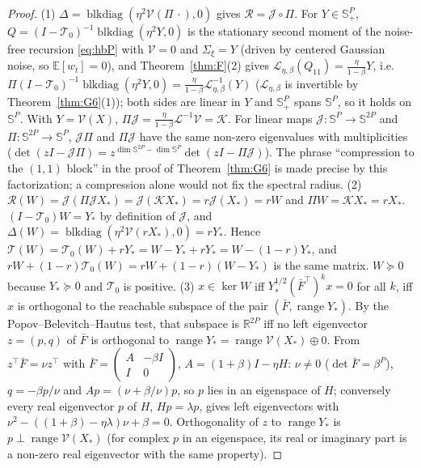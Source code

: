 \documentclass[11pt]{article}
\theoremstyle{remark}
\newcommand{\E}{\mathbb{E}}
\newcommand{\R}{\mathbb{R}}
\begin{document}
\begin{proof}
(1) $\Delta=\operatorname{blkdiag}(\eta^2\mathcal V(\Pi\,\cdot),0)$ gives $\mathcal R=\mathcal J\circ\Pi$. For $Y\in\mathbb S^P_+$, $Q=(I-\mathcal T_0)^{-1}\operatorname{blkdiag}(\eta^2Y,0)$ is the stationary second moment of the noise-free recursion \eqref{eq:hbP} with $\mathcal V=0$ and $\Sigma_\xi=Y$ (driven by centered Gaussian noise, so $\E[w_t]=0$), and Theorem~\ref{thm:F}(2) gives $\mathcal L_{\eta,\beta}(Q_{11})=\frac{\eta}{1-\beta}Y$, i.e.\ $\Pi(I-\mathcal T_0)^{-1}\operatorname{blkdiag}(\eta^2Y,0)=\frac{\eta}{1-\beta}\mathcal L_{\eta,\beta}^{-1}(Y)$ ($\mathcal L_{\eta,\beta}$ is invertible by Theorem~\ref{thm:G6}(1)); both sides are linear in $Y$ and $\mathbb S^P_+$ spans $\mathbb S^P$, so it holds on $\mathbb S^P$. With $Y=\mathcal V(X)$, $\Pi\mathcal J=\frac{\eta}{1-\beta}\mathcal L^{-1}\mathcal V=\mathcal K$. For linear maps $\mathcal J:\mathbb S^P\to\mathbb S^{2P}$ and $\Pi:\mathbb S^{2P}\to\mathbb S^P$, $\mathcal J\Pi$ and $\Pi\mathcal J$ have the same non-zero eigenvalues with multiplicities ($\det(zI-\mathcal J\Pi)=z^{\dim\mathbb S^{2P}-\dim\mathbb S^P}\det(zI-\Pi\mathcal J)$). The phrase ``compression to the $(1,1)$ block'' in the proof of Theorem~\ref{thm:G6} is made precise by this factorization; a compression alone would not fix the spectral radius.
(2) $\mathcal R(W)=\mathcal J(\Pi\mathcal J X_*)=\mathcal J(\mathcal KX_*)=r\mathcal J(X_*)=rW$ and $\Pi W=\mathcal KX_*=rX_*$. $(I-\mathcal T_0)W=Y_*$ by definition of $\mathcal J$, and $\Delta(W)=\operatorname{blkdiag}(\eta^2\mathcal V(rX_*),0)=rY_*$. Hence $\mathcal T(W)=\mathcal T_0(W)+rY_*=W-Y_*+rY_*=W-(1-r)Y_*$, and $rW+(1-r)\mathcal T_0(W)=rW+(1-r)(W-Y_*)$ is the same matrix. $W\succeq0$ because $Y_*\succeq0$ and $\mathcal T_0$ is positive.
(3) $x\in\ker W$ iff $Y_*^{1/2}(\bar F^\top)^kx=0$ for all $k$, iff $x$ is orthogonal to the reachable subspace of the pair $(\bar F,\operatorname{range}Y_*)$. By the Popov--Belevitch--Hautus test, that subspace is $\R^{2P}$ iff no left eigenvector $z=(p,q)$ of $\bar F$ is orthogonal to $\operatorname{range}Y_*=\operatorname{range}\mathcal V(X_*)\oplus0$. From $z^\top\bar F=\nu z^\top$ with $\bar F=\begin{pmatrix}A&-\beta I\\I&0\end{pmatrix}$, $A=(1+\beta)I-\eta H$: $\nu\ne0$ ($\det\bar F=\beta^P$), $q=-\beta p/\nu$ and $Ap=(\nu+\beta/\nu)p$, so $p$ lies in an eigenspace of $H$; conversely every real eigenvector $p$ of $H$, $Hp=\lambda p$, gives left eigenvectors with $\nu^2-((1+\beta)-\eta\lambda)\nu+\beta=0$. Orthogonality of $z$ to $\operatorname{range}Y_*$ is $p\perp\operatorname{range}\mathcal V(X_*)$ (for complex $p$ in an eigenspace, its real or imaginary part is a non-zero real eigenvector with the same property).

\end{proof}
\end{document}
